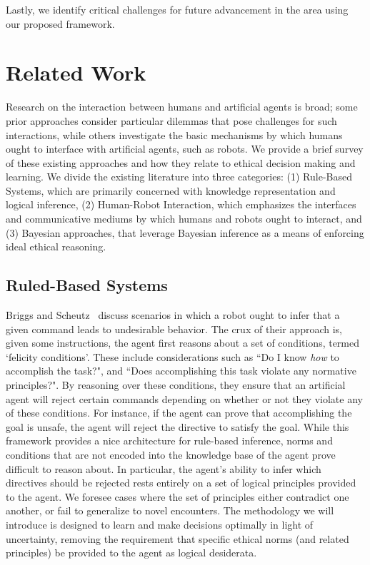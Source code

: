 \documentclass[11pt]{article}
\begin{document}
Lastly, we identify critical challenges for future advancement in the area using our proposed framework.


\section{Related Work}

Research on the interaction between humans and artificial agents is broad; some prior approaches consider particular dilemmas that pose challenges for such interactions, while others investigate the basic mechanisms by which humans ought to interface with artificial agents, such as robots. We provide a brief survey of these existing approaches and how they relate to ethical decision making and learning. We divide the existing literature into three categories: (1) Rule-Based Systems, which are primarily concerned with knowledge representation and logical inference, (2) Human-Robot Interaction, which emphasizes the interfaces and communicative mediums by which humans and robots ought to interact, and (3) Bayesian approaches, that leverage Bayesian inference as a means of enforcing ideal ethical reasoning.


\subsection{Ruled-Based Systems}

Briggs and Scheutz~ discuss scenarios in which a robot ought to infer that a given command leads to undesirable behavior. The crux of their approach is, given some instructions, the agent first reasons about a set of conditions, termed `felicity conditions'. These include considerations such as ``Do I know {\it how} to accomplish the task?", and ``Does accomplishing this task violate any normative principles?". By reasoning over these conditions, they ensure that an artificial agent will reject certain commands depending on whether or not they violate any of these conditions.  For instance, if the agent can prove that accomplishing the goal is unsafe, the agent will reject the directive to satisfy the goal. While this framework provides a nice architecture for rule-based inference, norms and conditions that are not encoded into the knowledge base of the agent prove difficult to reason about. In particular, the agent's ability to infer which directives should be rejected rests entirely on a set of logical principles provided to the agent. We foresee cases where the set of principles either contradict one another, or fail to generalize to novel encounters. The methodology we will introduce is designed to learn and make decisions optimally in light of uncertainty, removing the requirement that specific ethical norms (and related principles) be provided to the agent as logical desiderata.
\end{document}
